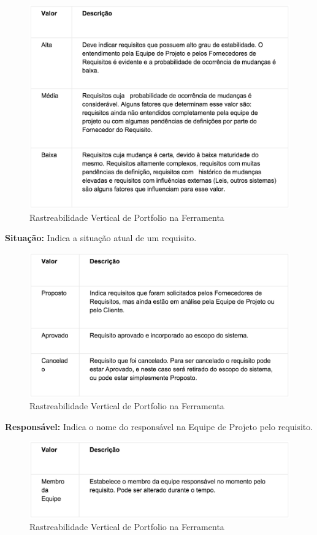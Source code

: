 \begin{figure}[H]
    \centering
	\includegraphics[keepaspectratio=true,scale=0.5]{figuras/atr10.eps}
    \caption{ Rastreabilidade Vertical de Portfolio na Ferramenta}
    \label{fig:ras}
\end{figure}

\textbf{Situação:} Indica a situação atual de um requisito.

\begin{figure}[H]
    \centering
	\includegraphics[keepaspectratio=true,scale=0.7]{figuras/atr4.eps}
    \caption{ Rastreabilidade Vertical de Portfolio na Ferramenta}
    \label{fig:ras}
\end{figure}

\textbf{Responsável:} Indica o nome do responsável na Equipe de Projeto pelo requisito.

\begin{figure}[H]
    \centering
	\includegraphics[keepaspectratio=true,scale=0.7]{figuras/atr5.eps}
    \caption{ Rastreabilidade Vertical de Portfolio na Ferramenta}
    \label{fig:ras}
\end{figure}

